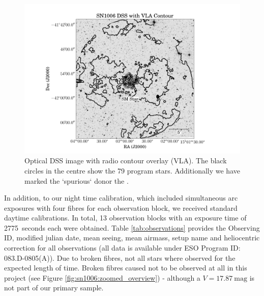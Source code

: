 \begin{figure}[tb] %
   \centering
   \includegraphics[width=\textwidth, trim=2cm 0 4cm 0, clip]{chapter_sn1006/plots/sn1006_overlay_withsm.pdf} 
   \caption[Overview of candidates and remnantin SN 1006]{Optical DSS image with radio contour overlay (VLA). The black circles in the centre show the 79 program stars. Additionally we have marked the `spurious` donor the \smstar.}
   \label{fig:overview_sn1006}
\end{figure}
In addition, to our night time calibration, which included simultaneous arc exposures with four fibres for each observation block, we received standard daytime calibrations. In total, 13 observation blocks with an exposure time of 2775~seconds each were obtained. Table \ref{tab:observations} provides the Observing ID, modified julian date, mean seeing, mean airmass, setup name and heliocentric correction for all observations (all data is available under ESO Program ID: 083.D-0805(A)). Due to broken fibres, not all stars where observed for the expected length of time. Broken fibres caused  not to be observed at all in this project (see Figure \ref{fig:sn1006:zoomed_overview}) - although a $V=17.87~\textrm{mag}$ is not part of our primary sample.


